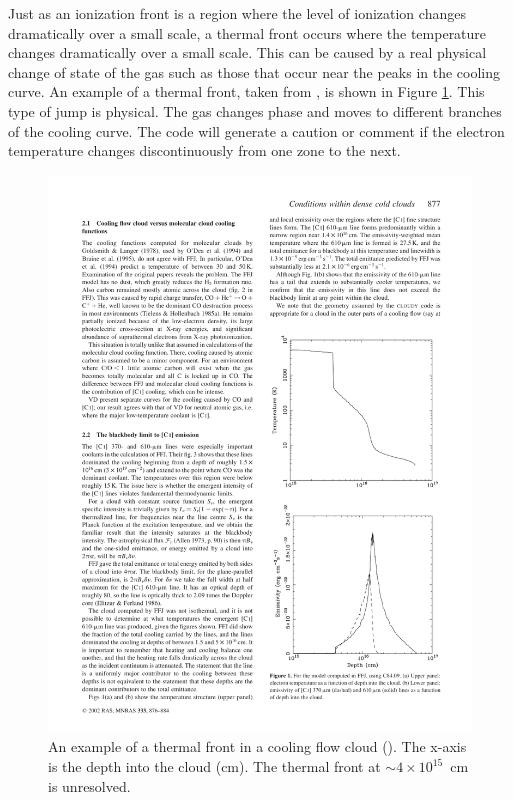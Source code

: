Just as an ionization front is a region where the level of ionization
changes dramatically over a small scale, a thermal front occurs where the
temperature changes dramatically over a small scale.  This can be caused
by a real physical change of state of the gas such as those that occur near
the peaks in the cooling curve.
An example of a thermal front, taken from
\citet{FerlandFabian2002}, is shown in Figure \ref{fig:thermal_front}.
This type of jump is physical.
The gas changes phase and moves to different branches
of the cooling curve.
The code will generate a caution or comment if the
electron temperature changes discontinuously from one zone to the next.

\begin{figure}
\centering
\includegraphics[scale=1.2]{thermal_front}
\caption[Thermal front example]{\label{fig:thermal_front}An example of a thermal front
in a cooling flow cloud
(\citealp{FerlandFabian2002}). The x-axis is the depth into the cloud (cm).
The thermal front at $\sim 4\times 10^{15}$~cm is unresolved.}
\end{figure}

